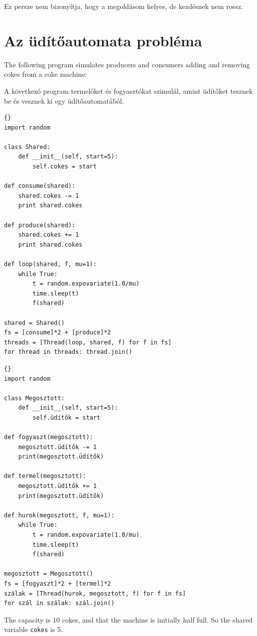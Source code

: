 \documentclass{book}
\newcommand{\clearemptydoublepage}{\newpage\cleardoublepage}
\begin{document}
Ez persze nem bizonyítja, hogy a megoldásom helyes, de kezdésnek
nem rossz.


\clearemptydoublepage
\section{Az üdítőautomata probléma}

The following program simulates producers and consumers
adding and removing cokes from a coke machine:

A következő program termelőket és fogyasztókat szimulál, amint
üdítőket tesznek be és vesznek ki egy üdítőautomatából.

\begin{lstlisting}[title={}]{}
import random

class Shared:
    def __init__(self, start=5):
        self.cokes = start

def consume(shared):
    shared.cokes -= 1
    print shared.cokes

def produce(shared):
    shared.cokes += 1
    print shared.cokes

def loop(shared, f, mu=1):
    while True:
        t = random.expovariate(1.0/mu)
        time.sleep(t)
        f(shared)

shared = Shared()
fs = [consume]*2 + [produce]*2 
threads = [Thread(loop, shared, f) for f in fs]
for thread in threads: thread.join()
\end{lstlisting}

\begin{lstlisting}[title={Üdítőautomata probléma}]{}
import random

class Megosztott:
    def __init__(self, start=5):
        self.üdítők = start

def fogyaszt(megosztott):
    megosztott.üdítők -= 1
    print(megosztott.üdítők)

def termel(megosztott):
    megosztott.üdítők += 1
    print(megosztott.üdítők)

def hurok(megosztott, f, mu=1):
    while True:
        t = random.expovariate(1.0/mu)
        time.sleep(t)
        f(shared)

megosztott = Megosztott()
fs = [fogyaszt]*2 + [termel]*2 
szálak = [Thread(hurok, megosztott, f) for f in fs]
for szál in szálak: szál.join()
\end{lstlisting}

The capacity is 10 cokes, and that the machine is initially
half full.  So the shared variable {\tt cokes} is 5.
\end{document}
